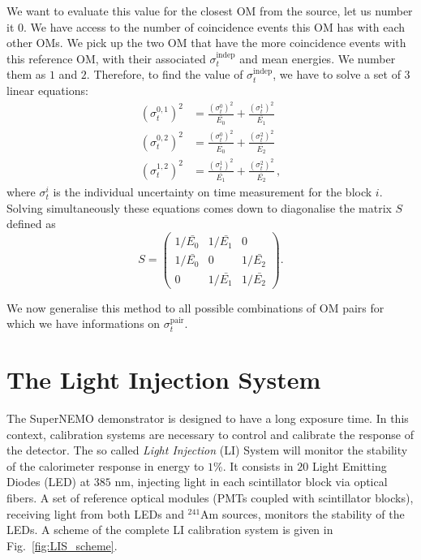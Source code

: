 We want to evaluate this value for the closest OM from the source, let us number it $0$.
We have access to the number of coincidence events this OM has with each other OMs.
We pick up the two OM that have the more coincidence events with this reference OM, with their associated $\sigma_{t}^{\text{indep}}$ and mean energies.
We number them as $1$ and $2$.
Therefore, to find the value of $\sigma_{t}^{\text{indep}}$, we have to solve a set of $3$ linear equations:
\begin{align}
  (\sigma_{t}^{0,1})^{2} &= \frac{(\sigma_{t}^{0})^{2}}{\bar{E_{0}}} + \frac{(\sigma_{t}^{1})^{2}}{\bar{E_{1}}}\nonumber \\
  (\sigma_{t}^{0,2})^{2} &= \frac{(\sigma_{t}^{0})^{2}}{\bar{E_{0}}} + \frac{(\sigma_{t}^{2})^{2}}{\bar{E_{2}}}\\
  (\sigma_{t}^{1,2})^{2} &= \frac{(\sigma_{t}^{1})^{2}}{\bar{E_{1}}} + \frac{(\sigma_{t}^{2})^{2}}{\bar{E_{2}}} \nonumber\,,
  \label{eq:Co_sigma}
\end{align}
where $\sigma_{t}^{i}$ is the individual uncertainty on time measurement for the block $i$.
Solving simultaneously these equations comes down to diagonalise the matrix $S$ defined as
\begin{equation}
S =
\begin{pmatrix}
 1/\bar{E_{0}} & 1/\bar{E_{1}} & 0 \\
 1/\bar{E_{0}} & 0 & 1/\bar{E_{2}} \\
 0 & 1/\bar{E_{1}} & 1/\bar{E_{2}}
\end{pmatrix}
.
\end{equation}

We now generalise this method to all possible combinations of OM pairs for which we have informations on $\sigma_{t}^{\text{pair}}$.




\section{The Light Injection System}
\label{sec:LIS}

The SuperNEMO demonstrator is designed to have a long exposure time.
In this context, calibration systems are necessary to control and calibrate the response of the detector.
The so called \emph{Light Injection} (LI) System will monitor the stability of the calorimeter response in energy to $1$\%.
It consists in $20$ Light Emitting Diodes (LED) at $385$ nm, injecting light in each scintillator block via optical fibers.
A set of reference optical modules (PMTs coupled with scintillator blocks), receiving light from both LEDs and $^{241}$Am sources, monitors the stability of the LEDs.
A scheme of the complete LI calibration system is given in Fig.~\ref{fig:LIS_scheme}.

